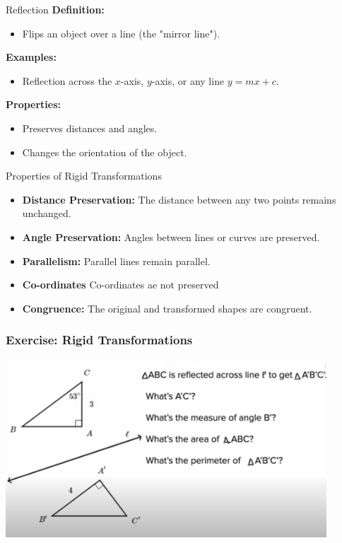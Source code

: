 \documentclass{beamer}
\begin{document}
    \begin{frame}{Reflection}
        \textbf{Definition:}
        \begin{itemize}
            \item Flips an object over a line (the "mirror line").
        \end{itemize}
        \textbf{Examples:}
        \begin{itemize}
            \item Reflection across the \(x\)-axis, \(y\)-axis, or any line \(y = mx + c\).
        \end{itemize}
        \textbf{Properties:}
        \begin{itemize}
            \item Preserves distances and angles.
            \item Changes the orientation of the object.
        \end{itemize}
    \end{frame}
    
    \begin{frame}{Properties of Rigid Transformations}
        \begin{itemize}
            \item \textbf{Distance Preservation:} The distance between any two points remains unchanged.
            \item \textbf{Angle Preservation:} Angles between lines or curves are preserved.
            \item \textbf{Parallelism:} Parallel lines remain parallel.
            \item \textbf{Co-ordinates} Co-ordinates ae not preserved 
            \item \textbf{Congruence:} The original and transformed shapes are congruent.
        \end{itemize}
    \end{frame}
    
  \begin{frame}
    \frametitle{Exercise: Rigid Transformations}
    \begin{center}
        \includegraphics[width=0.9\textwidth]{exer_20.png} 
    \end{center}
  \end{frame}
\end{document}
